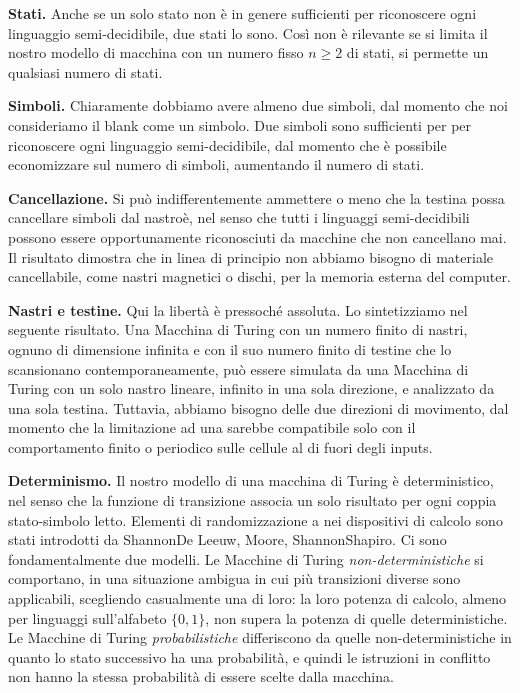 \documentclass[runningheads,a4paper]{llncs}
\begin{document}
\textbf{Stati.} Anche se un solo stato non \`{e} in genere sufficienti per riconoscere ogni linguaggio semi-decidibile, due stati lo sono. Cos\`{i} non \`{e} rilevante se si limita il nostro modello di macchina con un numero fisso $n\geq 2$ di stati, si permette un qualsiasi numero di stati.

\textbf{Simboli.} Chiaramente dobbiamo avere almeno due simboli, dal momento che noi consideriamo il blank come un simbolo. Due simboli sono sufficienti per per riconoscere ogni linguaggio semi-decidibile, dal momento che \`{e} possibile economizzare sul numero di simboli, aumentando il numero di stati.

\textbf{Cancellazione.} Si pu\`{o} indifferentemente ammettere o meno che la testina possa cancellare simboli dal nastro\`{e}, nel senso che tutti i linguaggi semi-decidibili possono essere opportunamente riconosciuti da macchine che non cancellano mai. Il risultato dimostra che in linea di principio non abbiamo bisogno di materiale cancellabile, come nastri magnetici o dischi, per la memoria esterna del computer.

\textbf{Nastri e testine.} Qui la libert\`{a} \`{e} pressoch\'{e} assoluta. Lo sintetizziamo nel seguente risultato. Una Macchina di Turing con un numero finito di nastri, ognuno di dimensione infinita e con il suo numero finito di testine che lo scansionano contemporaneamente, pu\`{o} essere simulata da una Macchina di Turing con un solo nastro lineare, infinito in una sola direzione, e analizzato da una sola testina. Tuttavia, abbiamo bisogno delle due direzioni di movimento, dal momento che la limitazione ad una sarebbe compatibile solo con il comportamento finito o periodico sulle cellule al di fuori degli inputs.

\textbf{Determinismo.} Il nostro modello di una macchina di Turing \`{e} deterministico, nel senso che la funzione di transizione associa un solo risultato per ogni coppia stato-simbolo letto. Elementi di randomizzazione a nei dispositivi di calcolo sono stati introdotti da Shannon\textendash De Leeuw, Moore, Shannon\textendash Shapiro. Ci sono fondamentalmente due modelli. Le Macchine di Turing \emph{non-deterministiche} si comportano, in una situazione ambigua in cui pi\`{u} transizioni diverse sono applicabili, scegliendo casualmente una di loro: la loro potenza di calcolo, almeno per linguaggi sull'alfabeto $\{0,1\}$, non supera la potenza di quelle deterministiche. Le Macchine di Turing \emph{probabilistiche} differiscono da quelle non-deterministiche in quanto lo stato successivo ha una probabilit\`{a}, e quindi le istruzioni in conflitto non hanno la stessa probabilit\`{a} di essere scelte dalla macchina.
\end{document}
